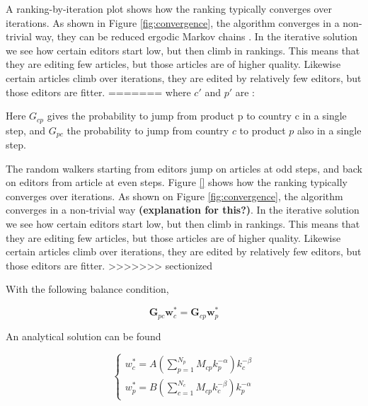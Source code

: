 A ranking-by-iteration plot shows how the ranking typically converges over iterations. As shown in Figure \ref{fig:convergence}, the algorithm converges in a non-trivial way, they can be reduced ergodic Markov chains \cite{Firm Grounds}. In the iterative solution we see how certain editors start low, but then climb in rankings. This means that they are editing few articles, but those articles are of higher quality. Likewise certain articles climb over iterations, they are edited by relatively few editors, but those editors are fitter.
=======
where $c'$ and $p'$ are :

Here $G_{cp}$ gives the probability to jump from product p to country c
in a single step, and $G_{pc}$ the probability to jump from country $c$ to
product $p$ also in a single step.


The random walkers starting from editors jump on articles at odd steps, and back on editors from article at even steps. Figure \ref{} shows how the ranking typically converges over iterations. As shown on Figure \ref{fig:convergence}, the algorithm converges in a non-trivial way {\bf (explanation for this?)}. In the iterative solution we see how certain editors start low, but then climb in rankings. This means that they are editing few articles, but those articles are of higher quality. Likewise certain articles climb over iterations, they are edited by relatively few editors, but those editors are fitter.
>>>>>>> sectionized

With the following balance condition,

\begin{equation}
\mathbf{G}_{pc} \mathbf{w}^*_c = \mathbf{G}_{cp} \mathbf{w}^*_p
\end{equation}

An analytical solution can be found \cite{caldarelli}

\begin{equation}
\begin{cases}
 w^*_c = A(\sum^{N_p}_{p=1} M_{cp}k_p^{-\alpha})k_c^{-\beta} \\
w^*_p = B(\sum^{N_c}_{c=1} M_{cp}k_c^{-\beta})k_p^{-\alpha}
\end{cases}
\end{equation}


